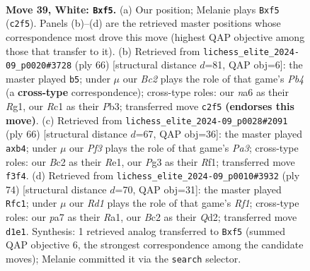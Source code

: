 \documentclass[11pt]{article}
\begin{document}
\clearpage

\begin{figure}[p]\centering
\begin{subfigure}{0.46\textwidth}\centering
\resizebox{\linewidth}{!}{%
\newchessgame
\chessboard[
  setfen={r5k1/pp6/n2Q2p1/2pP1b2/6p1/P4PPq/1PB5/2RR2K1 w - - 0 39},
  showmover=false,
  pgfstyle=straightmove, color=movearrow, markmove={c2-f5}
]}
\caption{}
\end{subfigure}\hfill
\begin{subfigure}{0.46\textwidth}\centering
\resizebox{\linewidth}{!}{%
\newchessgame
\chessboard[
  setfen={1kr5/2pQ3p/bp3p2/3P4/1P2Pp2/1P4P1/5P1q/1K1R2R1 w - - 1 34},
  showmover=false,
  pgfstyle=straightmove, color=movearrow, markmove={b4-b5}
]}
\caption{}
\end{subfigure}
\\[4pt]
\begin{subfigure}{0.46\textwidth}\centering
\resizebox{\linewidth}{!}{%
\newchessgame
\chessboard[
  setfen={6k1/4r1p1/q1p1n2p/2PpPQ2/1p6/P1P3P1/7P/4RRK1 w - - 0 34},
  showmover=false,
  pgfstyle=straightmove, color=movearrow, markmove={a3-b4}
]}
\caption{}
\end{subfigure}\hfill
\begin{subfigure}{0.46\textwidth}\centering
\resizebox{\linewidth}{!}{%
\newchessgame
\chessboard[
  setfen={1r6/6bk/2q4p/p3pP2/5n2/P4Pp1/3QB1Pp/R4R1K w - - 0 38},
  showmover=false,
  pgfstyle=straightmove, color=movearrow, markmove={f1-c1}
]}
\caption{}
\end{subfigure}
\caption{\textbf{Move 39, White: \texttt{Bxf5}.} (a) Our position; Melanie plays \texttt{Bxf5} (\texttt{c2f5}). Panels (b)--(d) are the retrieved master positions whose correspondence most drove this move (highest QAP objective among those that transfer to it). (b) Retrieved from \texttt{lichess\_elite\_2024-09\_p0020\#3728} (ply 66) [structural distance $d$=81, QAP obj=6]: the master played \texttt{b5}; under $\mu$ our \emph{Bc2} plays the role of that game's \emph{Pb4} (a \textbf{cross-type} correspondence); cross-type roles: our \emph{n}a6 as their \emph{R}g1, our \emph{R}c1 as their \emph{P}b3; transferred move \texttt{c2f5} \textbf{(endorses this move)}. (c) Retrieved from \texttt{lichess\_elite\_2024-09\_p0028\#2091} (ply 66) [structural distance $d$=67, QAP obj=36]: the master played \texttt{axb4}; under $\mu$ our \emph{Pf3} plays the role of that game's \emph{Pa3}; cross-type roles: our \emph{B}c2 as their \emph{R}e1, our \emph{P}g3 as their \emph{R}f1; transferred move \texttt{f3f4}. (d) Retrieved from \texttt{lichess\_elite\_2024-09\_p0010\#3932} (ply 74) [structural distance $d$=70, QAP obj=31]: the master played \texttt{Rfc1}; under $\mu$ our \emph{Rd1} plays the role of that game's \emph{Rf1}; cross-type roles: our \emph{p}a7 as their \emph{R}a1, our \emph{B}c2 as their \emph{Q}d2; transferred move \texttt{d1e1}. Synthesis: 1 retrieved analog transferred to \texttt{Bxf5} (summed QAP objective 6, the strongest correspondence among the candidate moves); Melanie committed it via the \texttt{search} selector.}
\label{fig:thought-m76}
\end{figure}
\end{document}
